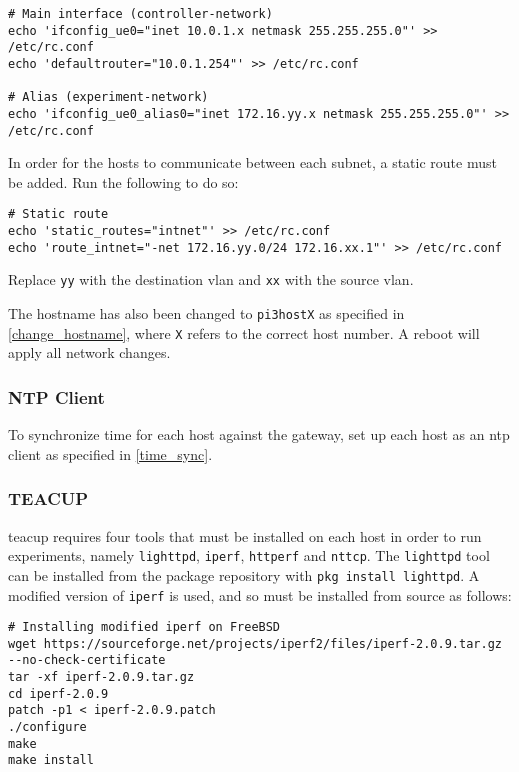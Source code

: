 \begin{verbatim}
# Main interface (controller-network)
echo 'ifconfig_ue0="inet 10.0.1.x netmask 255.255.255.0"' >> /etc/rc.conf
echo 'defaultrouter="10.0.1.254"' >> /etc/rc.conf

# Alias (experiment-network)
echo 'ifconfig_ue0_alias0="inet 172.16.yy.x netmask 255.255.255.0"' >> /etc/rc.conf
\end{verbatim}

In order for the hosts to communicate between each subnet, a static route must be added. Run the following to do so:

\begin{verbatim}
# Static route
echo 'static_routes="intnet"' >> /etc/rc.conf
echo 'route_intnet="-net 172.16.yy.0/24 172.16.xx.1"' >> /etc/rc.conf
\end{verbatim}

Replace \lstinline{yy} with the destination \gls{vlan} and \lstinline{xx} with the source \gls{vlan}.

The hostname has also been changed to \lstinline{pi3hostX} as specified in \ref{change_hostname}, where \lstinline{X} refers to the correct host number. A reboot will apply all network changes.


\subsubsection{NTP Client}

To synchronize time for each host against the gateway, set up each host as an \gls{ntp} client as specified in \ref{time_sync}.


\subsubsection{TEACUP}

\gls{teacup} requires four tools that must be installed on each host in order to run experiments, namely \lstinline{lighttpd},  \lstinline{iperf}, \lstinline{httperf} and \lstinline{nttcp}. The \lstinline{lighttpd} tool can be installed from the package repository with \lstinline{pkg install lighttpd}. A modified version of \lstinline{iperf} is used, and so must be installed from source as follows:

\begin{verbatim}
# Installing modified iperf on FreeBSD
wget https://sourceforge.net/projects/iperf2/files/iperf-2.0.9.tar.gz --no-check-certificate
tar -xf iperf-2.0.9.tar.gz
cd iperf-2.0.9
patch -p1 < iperf-2.0.9.patch
./configure
make
make install
\end{verbatim}

